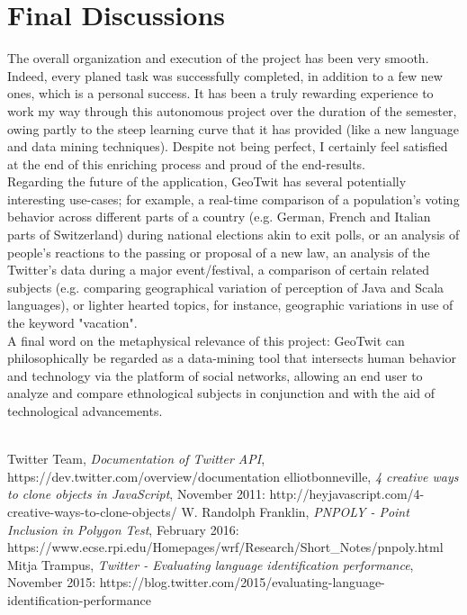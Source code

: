 \documentclass[a4paper,11pt]{report}
\begin{document}
\section{Final Discussions}
The overall organization and execution of the project has been very smooth. Indeed, every planed task was successfully completed, in addition to a few new ones, which is a personal success. It has been a truly rewarding experience to work my way through this autonomous project over the duration of the semester, owing partly to the steep learning curve that it has provided (like a new language and data mining techniques). Despite not being perfect, I certainly feel satisfied at the end of this enriching process and proud of the end-results.\\

Regarding the future of the application, GeoTwit has several potentially interesting use-cases; for example, a real-time comparison of a population's voting behavior across different parts of a country (e.g. German, French and Italian parts of Switzerland) during national elections akin to exit polls, or an analysis of people's reactions to the passing or proposal of a new law, an analysis of the Twitter's data during a major event/festival, a comparison of certain related subjects (e.g. comparing geographical variation of perception of Java and Scala languages), or lighter hearted topics, for instance, geographic variations in use of the keyword "vacation".\\

A final word on the metaphysical relevance of this project: GeoTwit can philosophically be regarded as a data-mining tool that intersects human behavior and technology via the platform of social networks, allowing an end user to analyze and compare ethnological subjects in conjunction and with the aid of technological advancements.\\\\

\begin{thebibliography}{9}
  Twitter Team,
  \emph{Documentation of Twitter API},
  https://dev.twitter.com/overview/documentation
  elliotbonneville,
  \emph{4 creative ways to clone objects in JavaScript},
  November 2011: http://heyjavascript.com/4-creative-ways-to-clone-objects/
  W. Randolph Franklin,
  \emph{PNPOLY - Point Inclusion in Polygon Test},
  February 2016: https://www.ecse.rpi.edu/Homepages/wrf/Research/Short\_Notes/pnpoly.html
  Mitja Trampus,
  \emph{Twitter - Evaluating language identification performance},
  November 2015: https://blog.twitter.com/2015/evaluating-language-identification-performance

\end{thebibliography}
\end{document}
